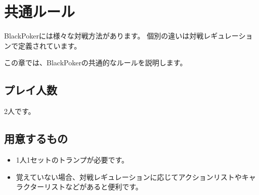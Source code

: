 \documentclass[letterpaper,10pt,dvipdfmx]{sphinxmanual}
\begin{document}
\sphinxstepscope


\chapter{共通ルール}
\label{\detokenize{common/common:common-rst}}\label{\detokenize{common/common:id1}}\label{\detokenize{common/common::doc}}
\sphinxAtStartPar
BlackPokerには様々な対戦方法があります。
個別の違いは対戦レギュレーションで定義されています。

\sphinxAtStartPar
この章では、BlackPokerの共通的なルールを説明します。


\section{プレイ人数}
\label{\detokenize{common/common:id2}}
\sphinxAtStartPar
2人です。


\section{用意するもの}
\label{\detokenize{common/common:id3}}\begin{itemize}
\item {} 
\sphinxAtStartPar
1人1セットのトランプが必要です。

\item {} 
\sphinxAtStartPar
覚えていない場合、対戦レギュレーションに応じてアクションリストやキャラクターリストなどがあると便利です。

\end{itemize}
\end{document}
